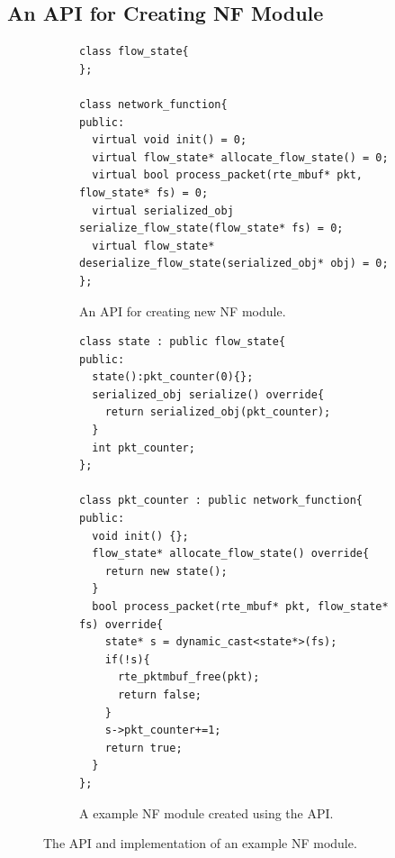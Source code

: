
\subsection{An API for Creating NF Module}

\begin{figure}[!t]
	\begin{subfigure}[b]{\columnwidth}
		\centering
 	 	\lstset{language=C++, numbers=left, showspaces=false,
    		showstringspaces=false, tabsize=2, breaklines=true,
    		xleftmargin=5.0ex, basicstyle=\scriptsize,
		}

		\begin{lstlisting}
class flow_state{
};

class network_function{
public:
  virtual void init() = 0;
  virtual flow_state* allocate_flow_state() = 0;
  virtual bool process_packet(rte_mbuf* pkt, flow_state* fs) = 0;
  virtual serialized_obj serialize_flow_state(flow_state* fs) = 0;
  virtual flow_state* deserialize_flow_state(serialized_obj* obj) = 0;
};
		\end{lstlisting}
		\caption{An API for creating new NF module.}
		\label{fig:api}
    \end{subfigure}\hfill
	\begin{subfigure}[b]{\columnwidth}
		\centering
 	 	\lstset{language=C++, numbers=left, showspaces=false,
    		showstringspaces=false, tabsize=2, breaklines=true,
    		xleftmargin=5.0ex, basicstyle=\scriptsize,
		}

		\begin{lstlisting}
class state : public flow_state{
public:
  state():pkt_counter(0){};
  serialized_obj serialize() override{
    return serialized_obj(pkt_counter);
  }
  int pkt_counter;
};

class pkt_counter : public network_function{
public:
  void init() {};
  flow_state* allocate_flow_state() override{
    return new state();
  }
  bool process_packet(rte_mbuf* pkt, flow_state* fs) override{
    state* s = dynamic_cast<state*>(fs);
    if(!s){
      rte_pktmbuf_free(pkt);
      return false;
    }
    s->pkt_counter+=1;
    return true;
  }
};
		\end{lstlisting}
		\caption{A example NF module created using the API.}\label{fig:example}
	\end{subfigure}
\caption{The API and implementation of an example NF module.}
\label{fig:base-class}
\end{figure}

